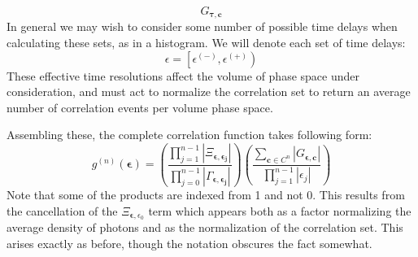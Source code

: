 \documentclass{article}
\newcommand{\parens}[1]{\ensuremath{\left( #1 \right)}}
\newcommand{\gn}[1]{\ensuremath{g^{(#1)}}}
\renewcommand{\vec}{\boldsymbol}
\newcommand{\abs}[1]{\ensuremath{\left|#1\right|}}
\newcommand{\channel}{\ensuremath{c}}
\newcommand{\channels}{\ensuremath{C}}
\newcommand{\photons}{\ensuremath{\Gamma}}
\newcommand{\integrationtime}{\ensuremath{\Xi}}
\newcommand{\resolution}{\ensuremath{\epsilon}}
\newcommand{\correlationset}{\ensuremath{G}}
\newcommand{\upplus}{\ensuremath{^{(+)}}}
\newcommand{\upminus}{\ensuremath{^{(-)}}}
\begin{document}
\begin{equation}
\correlationset_{\vec{\tau},\vec{\channel}}
\end{equation}
In general we may wish to consider some number of possible time delays when calculating these sets, as in a histogram. We will denote each set of time delays:
\begin{equation}
\resolution = \left[\resolution\upminus,\resolution\upplus\right)
\end{equation}
These effective time resolutions affect the volume of phase space under consideration, and must act to normalize the correlation set to return an average number of correlation events per volume phase space. 

Assembling these, the complete correlation function takes following form:
\begin{equation}
\label{eq:gn_full}
\gn{n}\parens{\vec{\resolution}} = \parens{\frac{\prod_{j=1}^{n-1}
                                                       {\abs{\integrationtime_{
                                                                 \vec{\resolution},
                                                                 \vec{\resolution_{j}}}}}}
                                                {\prod_{j=0}^{n-1}
                                                       {\abs{\photons_{
                                                                 \vec{\resolution},
                                                                 \vec{\resolution_{j}}}}}}}
                            \parens{\frac{\sum_{\vec{\channel}\in\channels^{n}}
                                               {\abs{\correlationset_{\vec{\resolution},
                                                                      \vec{\channel}}}}}
                                         {\prod_{j=1}^{n-1}{\abs{\resolution_{j}}}}}
\end{equation}
Note that some of the products are indexed from 1 and not 0. This results from the cancellation of the $\integrationtime_{\vec{\resolution},\resolution_{0}}$ term which appears both as a factor normalizing the average density of photons and as the normalization of the correlation set. This arises exactly as before, though the notation obscures the fact somewhat.
\end{document}
